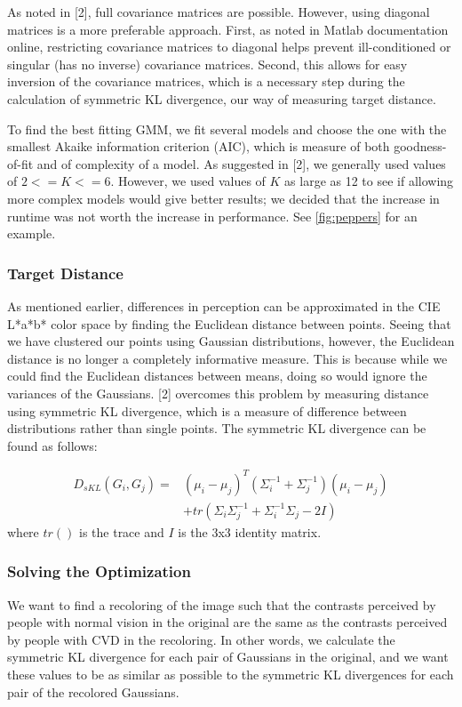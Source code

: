 \documentclass[10pt,twocolumn,letterpaper]{article}
\begin{document}
As noted in [2], full covariance matrices are possible. However, using diagonal matrices is a more preferable approach. First, as noted in Matlab documentation online, restricting covariance matrices to diagonal helps prevent ill-conditioned or singular (has no inverse) covariance matrices. Second, this allows for easy inversion of the covariance matrices, which is a necessary step during the calculation of symmetric KL divergence, our way of measuring target distance. 

To find the best fitting GMM, we fit several models and choose the one with the smallest Akaike information criterion (AIC), which is measure of both goodness-of-fit and of complexity of a model. As suggested in [2], we generally used values of $2 <= K <= 6$. However, we used values of $K$ as large as 12 to see if allowing more complex models would give better results; we decided that the increase in runtime was not worth the increase in performance. See \ref{fig:peppers} for an example. 

\subsubsection{Target Distance}
As mentioned earlier, differences in perception can be approximated in the CIE L*a*b* color space by finding the Euclidean distance between points. Seeing that we have clustered our points using Gaussian distributions, however, the Euclidean distance is no longer a completely informative measure. This is because while we could find the Euclidean distances between means, doing so would ignore the variances of the Gaussians. [2] overcomes this problem by measuring distance using symmetric KL divergence, which is a measure of difference between distributions rather than single points. The symmetric KL divergence can be found as follows:

\begin{align*}
  D_{sKL}(G_i, G_j) = &(\mu_i - \mu_j)^T (\Sigma_i^{-1} + \Sigma_j^{-1}) (\mu_i - \mu_j) \\
  &+ tr(\Sigma_i \Sigma_j^{-1} + \Sigma_i^{-1} \Sigma_j - 2I)
\end{align*}
where $tr()$ is the trace and $I$ is the 3x3 identity matrix. 

\subsubsection{Solving the Optimization}
We want to find a recoloring of the image such that the contrasts perceived by people with normal vision in the original are the same as the contrasts perceived by people with CVD in the recoloring. In other words, we calculate the symmetric KL divergence for each pair of Gaussians in the original, and we want these values to be as similar as possible to the symmetric KL divergences for each pair of the recolored Gaussians. 
\end{document}
